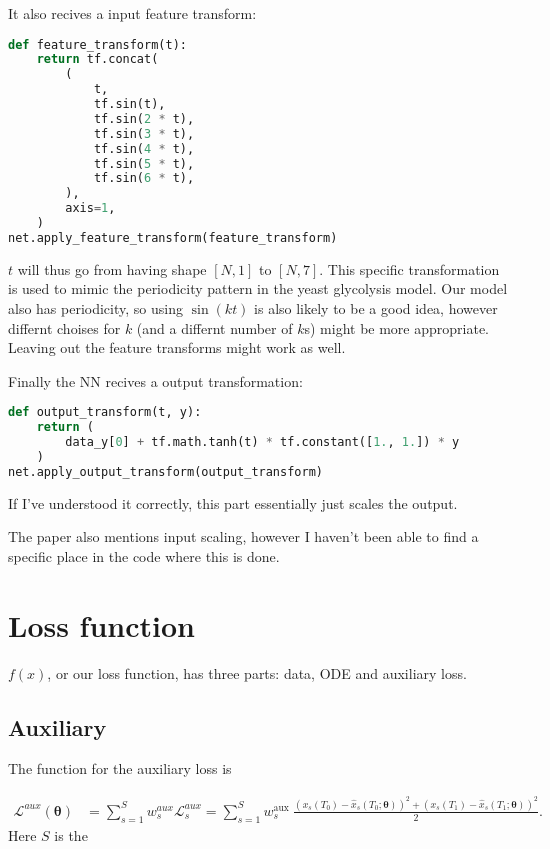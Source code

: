 \documentclass[a4paper]{article}
\begin{document}
It also recives a input feature transform:
\begin{lstlisting}[language=python]
def feature_transform(t):
	return tf.concat(
		(
			t,
			tf.sin(t),
			tf.sin(2 * t),
			tf.sin(3 * t),
			tf.sin(4 * t),
			tf.sin(5 * t),
			tf.sin(6 * t),
		),
		axis=1,
	)
net.apply_feature_transform(feature_transform)
\end{lstlisting}
$t$ will thus go from having shape $[N, 1]$ to $[N, 7]$. 
This specific transformation is used to mimic the periodicity pattern in the yeast glycolysis model. Our model also has periodicity, so using $\sin(kt)$ is also likely to be a good idea, however differnt choises for $k$ (and a differnt number of $k$s) might be more appropriate. Leaving out the feature transforms might work as well. 

Finally the NN recives a output transformation:
\begin{lstlisting}[language=python]
def output_transform(t, y):
	return (
		data_y[0] + tf.math.tanh(t) * tf.constant([1., 1.]) * y
	)
net.apply_output_transform(output_transform)
\end{lstlisting}
If I've understood it correctly, this part essentially just scales the output.

The paper also mentions input scaling, however I haven't been able to find a specific place in the code where this is done.




\section{Loss function}

$f(x)$, or our loss function, has three parts: data, ODE and auxiliary loss. 

\subsection{Auxiliary}

The function for the auxiliary loss is

\begin{align}
\mathcal{L}^{a u x}(\boldsymbol{\theta}) &= \sum_{s=1}^{S} w_{s}^{a u x} \mathcal{L}_{s}^{a u x}=\sum_{s=1}^{S} w_{s}^{\text {aux }} \frac{\left(x_{s}\left(T_{0}\right)-\hat{x}_{s}\left(T_{0} ; \boldsymbol{\theta}\right)\right)^{2}+\left(x_{s}\left(T_{1}\right)-\hat{x}_{s}\left(T_{1} ; \boldsymbol{\theta}\right)\right)^{2}}{2}.
\end{align}
Here $S$ is the 
\end{document}
